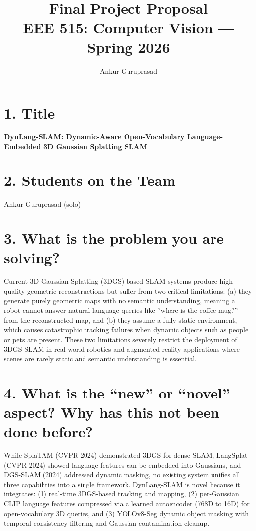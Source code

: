 \documentclass[11pt,letterpaper]{article}
\title{Final Project Proposal\\{\large EEE 515: Computer Vision --- Spring 2026}}
\author{Ankur Guruprasad}
\date{}
\begin{document}
\maketitle

\section*{1. Title}

\textbf{DynLang-SLAM: Dynamic-Aware Open-Vocabulary Language-Embedded 3D Gaussian Splatting SLAM}

\section*{2. Students on the Team}

Ankur Guruprasad (solo)

\section*{3. What is the problem you are solving?}

Current 3D Gaussian Splatting (3DGS) based SLAM systems produce high-quality geometric reconstructions but suffer from two critical limitations: (a) they generate purely geometric maps with no semantic understanding, meaning a robot cannot answer natural language queries like ``where is the coffee mug?'' from the reconstructed map, and (b) they assume a fully static environment, which causes catastrophic tracking failures when dynamic objects such as people or pets are present. These two limitations severely restrict the deployment of 3DGS-SLAM in real-world robotics and augmented reality applications where scenes are rarely static and semantic understanding is essential.

\section*{4. What is the ``new'' or ``novel'' aspect? Why has this not been done before?}

While SplaTAM (CVPR 2024) demonstrated 3DGS for dense SLAM, LangSplat (CVPR 2024) showed language features can be embedded into Gaussians, and DGS-SLAM (2024) addressed dynamic masking, no existing system unifies all three capabilities into a single framework. DynLang-SLAM is novel because it integrates: (1) real-time 3DGS-based tracking and mapping, (2) per-Gaussian CLIP language features compressed via a learned autoencoder (768D to 16D) for open-vocabulary 3D queries, and (3) YOLOv8-Seg dynamic object masking with temporal consistency filtering and Gaussian contamination cleanup.
\end{document}

